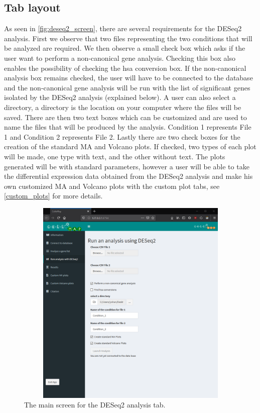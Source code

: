 \documentclass[11pt]{article}
\begin{document}
\subsection{Tab layout \label{deseq2_layout}}
As seen in \autoref{fig:deseq2_screen}, there are several requirements for the \acrshort{DESeq2} analysis. First we observe that two files representing the two conditions that will be analyzed are required. We then observe a small check box which asks if the user want to perform a non-canonical gene analysis. Checking this box also enables the possibility of checking the \acrshort{hsa} conversion box. If the non-canonical analysis box remains checked, the user will have to be connected to the database and the non-canonical gene analysis will be run with the list of significant genes isolated by the \acrshort{DESeq2} analysis (explained below). A user can also select a directory, a directory is the location on your computer where the files will be saved.
There are then two text boxes which can be customized and are used to name the files that will be produced by the analysis. Condition 1 represents File 1 and Condition 2 represents File 2.
Lastly there are two check boxes for the creation of the standard MA and Volcano plots. If checked, two types of each plot will be made, one type with text, and the other without text. The plots generated will be with standard parameters, however a user will be able to take the differential expression data obtained from the \acrshort{DESeq2} analysis and make his own customized MA and Volcano plots with the custom plot tabs, see \autoref{custom_plots} for more details.

\begin{figure}[h!]
\centering
\includegraphics[width=15cm,height=10cm,keepaspectratio]{deseq2_screen.png}
\caption{The main screen for the \acrshort{DESeq2} analysis tab.}
\label{fig:deseq2_screen}
\end{figure}
\end{document}
